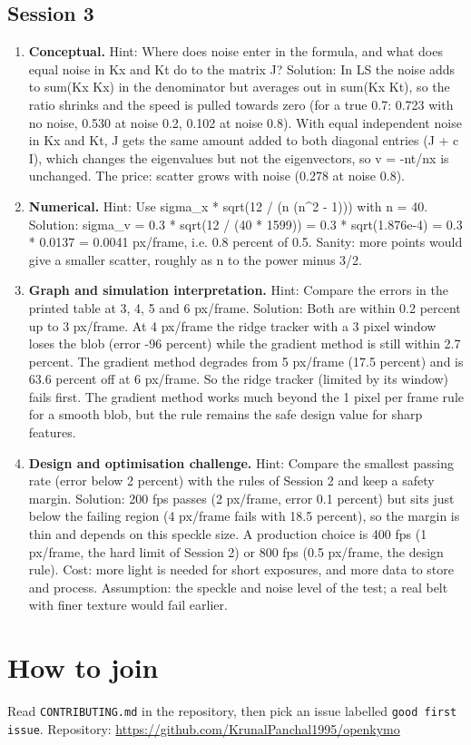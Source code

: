 \documentclass[11pt,a4paper]{article}
\begin{document}
\subsection*{Session 3}
\begin{enumerate}[nosep]
\item \textbf{Conceptual.} Hint: Where does noise enter in the formula, and what does equal noise in Kx and Kt do to the matrix J? Solution: In LS the noise adds to sum(Kx Kx) in the denominator but averages out in sum(Kx Kt), so the ratio shrinks and the speed is pulled towards zero (for a true 0.7: 0.723 with no noise, 0.530 at noise 0.2, 0.102 at noise 0.8). With equal independent noise in Kx and Kt, J gets the same amount added to both diagonal entries (J + c I), which changes the eigenvalues but not the eigenvectors, so v = -nt/nx is unchanged. The price: scatter grows with noise (0.278 at noise 0.8).
\item \textbf{Numerical.} Hint: Use sigma\_x * sqrt(12 / (n (n\textasciicircum{}2 - 1))) with n = 40. Solution: sigma\_v = 0.3 * sqrt(12 / (40 * 1599)) = 0.3 * sqrt(1.876e-4) = 0.3 * 0.0137 = 0.0041 px/frame, i.e. 0.8 percent of 0.5. Sanity: more points would give a smaller scatter, roughly as n to the power minus 3/2.
\item \textbf{Graph and simulation interpretation.} Hint: Compare the errors in the printed table at 3, 4, 5 and 6 px/frame. Solution: Both are within 0.2 percent up to 3 px/frame. At 4 px/frame the ridge tracker with a 3 pixel window loses the blob (error -96 percent) while the gradient method is still within 2.7 percent. The gradient method degrades from 5 px/frame (17.5 percent) and is 63.6 percent off at 6 px/frame. So the ridge tracker (limited by its window) fails first. The gradient method works much beyond the 1 pixel per frame rule for a smooth blob, but the rule remains the safe design value for sharp features.
\item \textbf{Design and optimisation challenge.} Hint: Compare the smallest passing rate (error below 2 percent) with the rules of Session 2 and keep a safety margin. Solution: 200 fps passes (2 px/frame, error 0.1 percent) but sits just below the failing region (4 px/frame fails with 18.5 percent), so the margin is thin and depends on this speckle size. A production choice is 400 fps (1 px/frame, the hard limit of Session 2) or 800 fps (0.5 px/frame, the design rule). Cost: more light is needed for short exposures, and more data to store and process. Assumption: the speckle and noise level of the test; a real belt with finer texture would fail earlier.
\end{enumerate}

\section{How to join}
Read \texttt{CONTRIBUTING.md} in the repository, then pick an issue labelled \texttt{good first issue}. Repository: \url{https://github.com/KrunalPanchal1995/openkymo}
\end{document}
